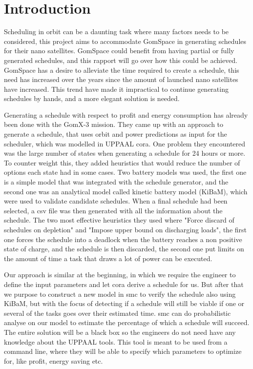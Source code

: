 \chapter{Introduction}\label{cha:intro}
Scheduling in orbit can be a daunting task where many factors needs to be considered, this project aims to accommodate GomSpace in generating schedules for their nano satellites. GomSpace could benefit from having partial or fully generated schedules, and this rapport will go over how this could be achieved. GomSpace has a desire to alleviate the time required to create a schedule, this need has increased over the years since the amount of launched nano satellites have increased. This trend have made it impractical to continue generating schedules by hands, and a more elegant solution is needed.

Generating a schedule with respect to profit and energy consumption has already been done with the GomX-3 mission\cite{gomx3}. They came up with an approach to generate a schedule, that uses orbit and power predictions as input for the scheduler, which was modelled in UPPAAL \acrshort{cora}. One problem they encountered was the large number of states when generating a schedule for 24 hours or more. To counter weight this, they added heuristics that would reduce the number of options each state had in some cases. Two battery models was used, the first one is a simple model that was integrated with the schedule generator, and the second one was an analytical model called kinetic battery model (KiBaM), which were used to validate candidate schedules. When a final schedule had been selected, a csv file was then generated with all the information about the schedule. The two most effective heuristics they used where "Force discard of schedules on depletion" and "Impose upper bound on discharging loads", the first one forces the schedule into a deadlock when the battery reaches a non positive state of charge, and the schedule is then discarded, the second one put limits on the amount of time a task that draws a lot of power can be executed\cite{gomx3}.

Our approach is similar at the beginning, in which we require the engineer to define the input parameters and let \acrshort{cora} derive a schedule for us. But after that we purpose to construct a new model in \acrshort{smc} to verify the schedule also using KiBaM, but with the focus of detecting if a schedule will still be viable if one or several of the tasks goes over their estimated time. \acrshort{smc} can do probabilistic analyse on our model to estimate the percentage of which a schedule will succeed. The entire solution will be a black box so the engineers do not need have any knowledge about the UPPAAL tools. This tool is meant to be used from a command line, where they will be able to specify which parameters to optimize for, like profit, energy saving etc.



